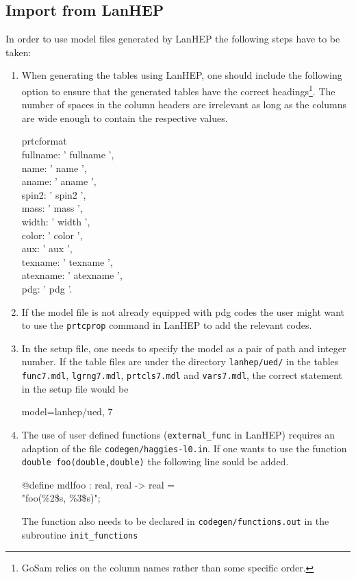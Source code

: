 \documentclass[11pt,a4paper]{refrep}
\newcommand{\gosamversion}{{2{.}0}}
\newcommand{\gosamv}[1][\gosamversion]{{\sc GoSam}\xspace}
\begin{document}
\subsection{Import from LanHEP}
In order to use model files generated by LanHEP the following steps
have to be taken:
\begin{enumerate}
\item When generating the tables using LanHEP, one should include the
   following option to ensure that the generated tables have the correct
   headings\footnote{\gosamv{} relies on the column names rather than
   some specific order.}. The number of spaces in the column headers are
   irrelevant as long as the columns are wide enough to contain the
   respective values.
\begin{example}
   prtcformat\\
      fullname: '  fullname  ',\\
      name:     '  name   ',\\
      aname:    '  aname  ',\\
      spin2:    '  spin2  ',\\
      mass:     '  mass  ',\\
      width:    '  width  ',\\
      color:    '  color  ',\\
      aux:      '  aux  ',\\
      texname:  '      texname      ',\\
      atexname: '     atexname      ',\\
      pdg:      '  pdg   '.
\end{example}
\item If the model file is not already equipped with pdg codes
   the user might want to use the \verb!prtcprop! command in
   LanHEP to add the relevant codes.
\item In the setup file, one needs to specify the model as a pair
   of path and integer number. If the table files are under the directory
   \texttt{lanhep/ued/} in the tables \texttt{func7.mdl}, \texttt{lgrng7.mdl},
   \texttt{prtcls7.mdl} and \texttt{vars7.mdl}, the correct statement in
   the setup file would be
\begin{example}
   model=lanhep/ued, 7
\end{example}
\item The use of user defined functions (\texttt{external\_func} in LanHEP)
   requires an adaption of the file \texttt{codegen/haggies-l0.in}. If one
   wants to use the function \texttt{double foo(double,double)} the
   following line sould be added.
\begin{example}
@define mdlfoo : real, real -> real =\\ "foo(\%2\$s, \%3\$s)";
\end{example}
   The function also needs to be declared in \texttt{codegen/functions.out}
   in the subroutine \texttt{init\_functions}
\end{enumerate}
\end{document}

